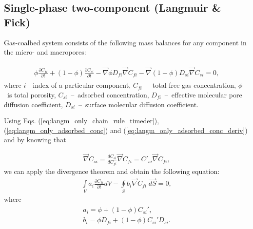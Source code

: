 \documentclass[a4paper,14pt,english]{extreport}
\begin{document}
 \subsection*{Single-phase two-component (Langmuir \& Fick)}
 Gas-coalbed system consists of the following mass balances for any component in the micro- and macropores:
 
 \begin{eqnarray}
 \begin{gathered}
 \label{eq:langm_fick_diffusivity_differential}
  \phi\frac{\partial C_{fi}}{\partial t} + \left(1-\phi\right)\frac{\partial C_{si}}{\partial t} - \vec{\nabla} \phi D_{fi} \vec{\nabla}C_{fi} - \vec{\nabla}\left(1-\phi \right) D_{si} \vec{\nabla}C_{si} = 0,
   \end{gathered}
 \end{eqnarray}
 where $i$ - index of  a particular component, $C_{fi}$~--~total free gas concentration, $\phi$~--~is total porosity, $C_{si}$~--~adsorbed concentration, $D_{fi}$~--~effective molecular pore diffusion coefficient, $D_{si}$~--~surface molecular diffusion coefficient.
 
 Using Eqs. (\ref{eq:langm_only_chain_rule_timeder}), (\ref{eq:langm_only_adsorbed_conc}) and (\ref{eq:langm_only_adsorbed_conc_deriv}) and by knowing that
 
  \begin{eqnarray}
 \label{eq:langm_fick_chain_rule_spaceder}
\vec\nabla C_{si} =  \frac{dC_{si}}{dC_{fi}}\vec\nabla C_{fi} = C'_{si}\vec\nabla C_{fi},
 \end{eqnarray}
we can apply the divergence theorem and obtain the following equation:
  \begin{eqnarray}
 \label{eq:langm_fick_diffusivity_simplified_integral}
 \int \limits_{V} a_{i} \frac{\partial C_{fi}}{\partial t} d V - \oint \limits_{S} b_{i} \vec{\nabla}C_{fi} \; \vec{dS} = 0,
 \end{eqnarray}
where  
 \begin{eqnarray}
 \begin{gathered}
 \label{eq:langm_fick_diffusivity_a_b_coeffs}
 a_{i}  =  \phi + \left(1-\phi \right)C_{si}', \\ 
 b_{i}  = \phi D_{fi} + \left(1-\phi \right) C_{si}'D_{si}.
 \end{gathered}
 \end{eqnarray}

 
\end{document}
